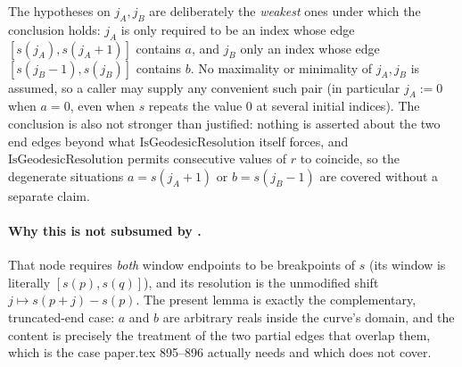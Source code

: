 \begin{lemma}
  The hypotheses on $j_A,j_B$ are deliberately the \emph{weakest} ones under which the conclusion
  holds: $j_A$ is only required to be an index whose edge $[s(j_A),s(j_A+1)]$ contains $a$, and
  $j_B$ only an index whose edge $[s(j_B-1),s(j_B)]$ contains $b$. No maximality or minimality of
  $j_A,j_B$ is assumed, so a caller may supply any convenient such pair (in particular $j_A := 0$
  when $a=0$, even when $s$ repeats the value $0$ at several initial indices). The conclusion is
  also not stronger than justified: nothing is asserted about the two end edges beyond what
  $\mathrm{IsGeodesicResolution}$ itself forces, and $\mathrm{IsGeodesicResolution}$ permits
  consecutive values of $r$ to coincide, so the degenerate situations $a = s(j_A+1)$ or $b =
  s(j_B-1)$ are covered without a separate claim.

  \paragraph{Why this is not subsumed by .} That node requires
  \emph{both} window endpoints to be breakpoints of $s$ (its window is literally $[s(p),s(q)]$),
  and its resolution is the unmodified shift $j \mapsto s(p+j)-s(p)$. The present lemma is exactly
  the complementary, truncated-end case: $a$ and $b$ are arbitrary reals inside the curve's domain,
  and the content is precisely the treatment of the two partial edges that overlap them, which is
  the case paper.tex 895--896 actually needs and which  does not
  cover.
\end{lemma}

